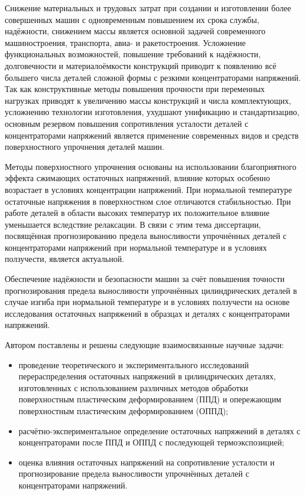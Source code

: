 {
\small
Снижение материальных и трудовых затрат при создании и изготовлении
более совершенных машин с одновременным повышением их срока службы,
надёжности, снижением массы является основной задачей современного
машиностроения, транспорта, авиа- и ракетостроения.
Усложнение функциональных возможностей, повышение требований к
надёжности, долговечности и материалоёмкости конструкций приводит к
появлению всё большего числа деталей сложной формы с резкими
концентраторами напряжений. Так как конструктивные методы повышения
прочности при переменных нагрузках приводят к увеличению массы
конструкций и числа комплектующих, усложнению технологии изготовления,
ухудшают унификацию и стандартизацию, основным резервом повышения
сопротивления усталости деталей с концентраторами напряжений является
применение современных видов и средств поверхностного упрочнения деталей
машин.

Методы поверхностного упрочнения основаны на использовании
благоприятного эффекта сжимающих остаточных напряжений, влияние которых
особенно возрастает в условиях концентрации напряжений. При нормальной
температуре остаточные напряжения в поверхностном слое отличаются
стабильностью. При работе деталей в области высоких температур их
положительное влияние уменьшается вследствие релаксации. В связи с этим
тема диссертации, посвящённая прогнозированию предела выносливости
упрочнённых деталей с концентраторами напряжений при нормальной
температуре и в условиях ползучести, является актуальной.

Обеспечение надёжности и безопасности машин за счёт
повышения точности прогнозирования предела выносливости упрочнённых
цилиндрических деталей в случае изгиба при нормальной температуре и в
условиях ползучести на основе исследования остаточных напряжений в
образцах и деталях с концентраторами напряжений.

Автором поставлены и решены следующие взаимосвязанные научные задачи:
\begin{itemize}
\item[--]  проведение теоретического и экспериментального исследований
перераспределения остаточных напряжений в цилиндрических деталях,
изготовленных с использованием различных методов обработки поверхностным
пластическим деформированием (ППД) и опережающим поверхностным
пластическим деформированием (ОППД);
\item[--]  расчётно-экспериментальное определение остаточных напряжений в
деталях с концентраторами после ППД и ОППД с последующей
термоэкспозицией;
\item[--]  оценка влияния остаточных напряжений на сопротивление усталости и
прогнозирование предела выносливости упрочнённых деталей с
концентраторами напряжений.
\end{itemize}

}

